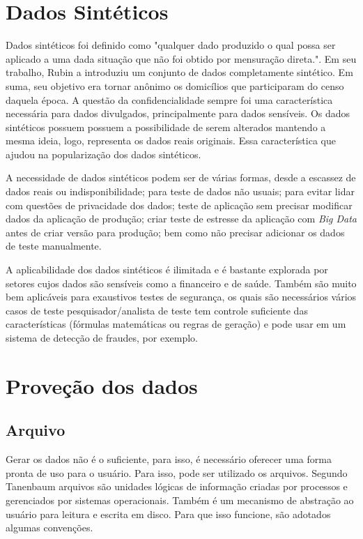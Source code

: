 \documentclass[
	12pt,				%
	openright,			%
	twoside,			%
	a4paper,			%
	english,			%
	brazil				%
	]{abntex2}
\begin{document}
	\section{Dados Sintéticos}
		Dados sintéticos foi definido como "qualquer dado produzido o qual possa ser aplicado a uma dada situação que não foi obtido por mensuração direta.". \cite{mcgraw-hilleducation2016}
		Em seu trabalho, Rubin \cite{rubin1993statistical} a introduziu um conjunto de dados completamente sintético.
		Em suma, seu objetivo era tornar anônimo os domicílios que participaram do censo daquela época.
		A questão da confidencialidade sempre foi uma característica necessária para dados divulgados, principalmente para dados sensíveis.
		Os dados sintéticos possuem possuem a possibilidade de serem alterados mantendo a mesma ideia, logo, representa os dados reais originais.
		Essa característica que ajudou na popularização dos dados sintéticos.
		\par
		A necessidade de dados sintéticos podem ser de várias formas, 
		desde a escassez de dados reais ou indisponibilidade;
		para teste de dados não usuais;
		para evitar lidar com questões de privacidade dos dados;
		teste de aplicação sem precisar modificar dados da aplicação de produção;
		criar teste de estresse da aplicação com \emph{Big Data} antes de criar versão para produção;
		bem como não precisar adicionar os dados de teste manualmente. \cite{top15DatagenTools2019}
		\par
		A aplicabilidade dos dados sintéticos é ilimitada e é bastante explorada por setores cujos dados são sensíveis como a financeiro \cite{lopez2012money} e de saúde. \cite{bergeat2014french} 	
		Também são muito bem aplicáveis para exaustivos testes de segurança, os quais são necessários vários casos de teste
		pesquisador/analista de teste tem controle suficiente das características (fórmulas matemáticas ou regras de geração) e pode usar em um sistema de detecção de fraudes, por exemplo. \cite{barse2003synthesizing}
		
	\section{Proveção dos dados}
		\subsection{Arquivo}
		Gerar os dados não é o suficiente, para isso, é necessário oferecer uma forma pronta de uso para o usuário.
		Para isso, pode ser utilizado os arquivos.
		Segundo Tanenbaum \cite{tanenbaum1995sistemas} arquivos são unidades lógicas de informação criadas por processos e gerenciados por sistemas operacionais.
		Também é um mecanismo de abstração ao usuário para leitura e escrita em disco.
		Para que isso funcione, são adotados algumas convenções.
		\par
\end{document}
